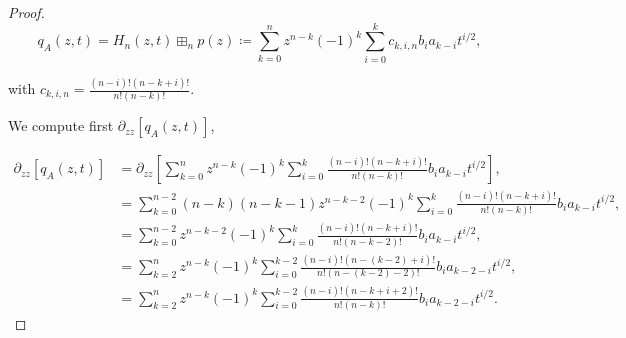 \begin{proof}
        \begin{equation*}
            q_A(z,t) = H_n(z,t) \boxplus_n p(z) \coloneqq \sum_{k=0}^n z^{n-k}(-1)^k \sum_{i=0}^k c_{k,i,n} b_i a_{k-i} t^{i/2},
        \end{equation*} 

        \noindent with $c_{k,i,n} = \frac{(n-i)!(n-k+i)!}{n!(n-k)!}$.



        



        We compute first $\partial_{zz} [q_A(z,t)]$,

        \begin{align*}
            \partial_{zz} [q_A(z,t)] %
            &= \partial_{zz} \left[ \sum_{k=0}^n z^{n-k}(-1)^k \sum_{i=0}^k \frac{(n-i)!(n-k+i)!}{n!(n-k)!} b_i a_{k-i} t^{i/2} \right],\\
            &= \sum_{k=0}^{n-2} (n-k)(n-k-1)z^{n-k-2}(-1)^k \sum_{i=0}^k \frac{(n-i)!(n-k+i)!}{n!(n-k)!} b_i a_{k-i} t^{i/2}, \\
            &= \sum_{k=0}^{n-2} z^{n-k-2}(-1)^k \sum_{i=0}^k \frac{(n-i)!(n-k+i)!}{n!(n-k-2)!} b_i a_{k-i} t^{i/2}, \\
            &= \sum_{k=2}^{n} z^{n-k}(-1)^k \sum_{i=0}^{k-2} \frac{(n-i)!(n-(k-2)+i)!}{n!(n-(k-2)-2)!} b_i a_{k-2-i}t^{i/2},\\ 
            &= \sum_{k=2}^{n} z^{n-k}(-1)^k \sum_{i=0}^{k-2} \frac{(n-i)!(n-k+i+2)!}{n!(n-k)!} b_i a_{k-2-i}t^{i/2}.
        \end{align*}


\end{proof}
